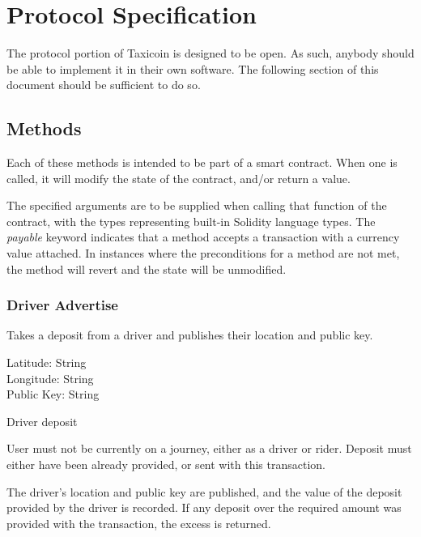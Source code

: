 \section{Protocol Specification}

The protocol portion of Taxicoin is designed to be open. As such, anybody should be able to implement it in their own software. The following section of this document should be sufficient to do so.

\subsection{Methods}

Each of these methods is intended to be part of a smart contract. When one is called, it will modify the state of the contract, and/or return a value.

The specified arguments are to be supplied when calling that function of the contract, with the types representing built-in Solidity language types. The \textit{payable} keyword indicates that a method accepts a transaction with a currency value attached. In instances where the preconditions for a method are not met, the method will revert and the state will be unmodified.

\subsubsection{Driver Advertise}

\begin{description}[leftmargin=8em,style=nextline]
	\item [Description]
		Takes a deposit from a driver and publishes their location and public key.
	\item [Arguments]
		Latitude: String \\
		Longitude: String \\
		Public Key: String
	\item [Payable]
		Driver deposit
	\item [Preconditions]
		User must not be currently on a journey, either as a driver or rider. Deposit must either have been already provided, or sent with this transaction.
	\item [Postconditions]
		The driver's location and public key are published, and the value of the deposit provided by the driver is recorded. If any deposit over the required amount was provided with the transaction, the excess is returned.
\end{description}

